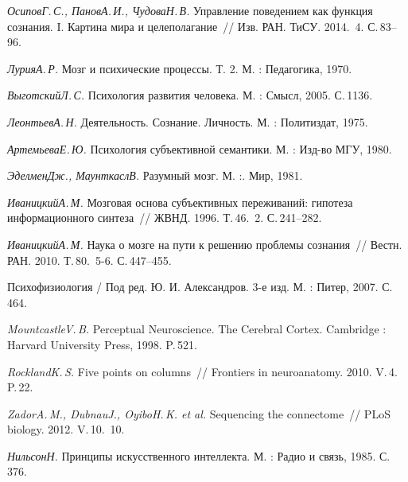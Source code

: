 \documentclass[a4paper, 12pt]{article}
\numberwithin{equation}{section}
\begin{document}
	\newpage
	\begin{thebibliography}{99}
		\textit{Осипов\;Г.\,С., Панов\;А.\,И., Чудова\;Н.\,В.}
		Управление поведением как функция сознания. I. Картина мира и целеполагание~//
		Изв. РАН. ТиСУ. 2014. \No\,4. С.\,83--96.
		
		\textit{Лурия\;А.\,Р.}
		Мозг и психические процессы. Т. 2.
		М. : Педагогика, 1970.
		
		\textit{Выготский\;Л.\,С.}
		Психология развития человека.
		М. : Смысл, 2005. С.\,1136.
		
		\textit{Леонтьев\;А.\,Н.}
		Деятельность. Сознание. Личность.
		М. : Политиздат, 1975.
		
		\textit{Артемьева\;Е.\,Ю.}
		Психология субъективной семантики.
		М. : Изд-во МГУ, 1980.
		
		\textit{Эделмен\;Дж., Маунткасл\;В.}
		Разумный мозг.
		М. :. Мир, 1981.
		
		\textit{Иваницкий\;А.\,М.}
		Мозговая основа субъективных переживаний: гипотеза информационного синтеза~//
		ЖВНД. 1996. Т.\,46. \No\,2. С.\,241--282.
		
		\textit{Иваницкий\;А.\,М.}
		Наука о мозге на пути к решению проблемы сознания~//
		Вестн. РАН. 2010. Т.\,80. \No\,5-6. С.\,447--455.
		
		Психофизиология / Под ред. Ю. И. Александров. 3-е изд.
		М. : Питер, 2007. С.\,464.
				
		\textit{Mountcastle\;V.\,B.}
		Perceptual Neuroscience. The Cerebral Cortex.
		Cambridge : Harvard University Press, 1998. P.\,521.
		
		\textit{Rockland\;K.\,S.}
		Five points on columns~//
		Frontiers in neuroanatomy. 2010. V.\,4. P.\,22.
		
		\textit{Zador\;A.\,M., Dubnau\;J., Oyibo\;H.\,K. et al.}
		Sequencing the connectome~//
		PLoS biology. 2012. V.\,10. \No\,10.
		
		\textit{Нильсон\;Н.}
		Принципы искусственного интеллекта.
		М. : Радио и связь, 1985. С.\,376.
		

\end{thebibliography}
\end{document}
